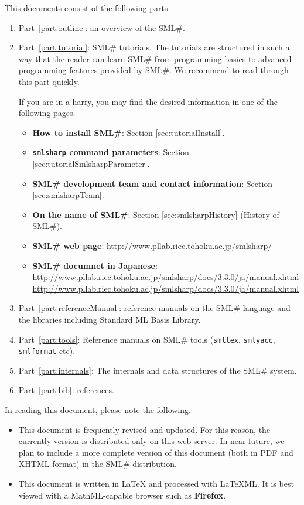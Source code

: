 \documentclass{jbook}
\newcommand{\smlsharp}{SML\#}
\newcommand{\version}{3.3.0}
\newcommand{\documentUrlJa}{\url{http://www.pllab.riec.tohoku.ac.jp/smlsharp/docs/3.3.0/ja/manual.xhtml}}
\begin{document}
\else%
	This documents consist of the following parts.
\begin{enumerate}
\item
	Part~\ref{part:outline}:
an overview of the \smlsharp{}.
\item
	Part~\ref{part:tutorial}: \smlsharp{} tutorials.
	The tutorials are structured in such a way that the reader can
learn \smlsharp{} from programming basics to advanced programming
features provided by \smlsharp{}.
	We recommend to read through this part quickly.

	If you are in a harry, you may find the desired information in
one of the following pages.
\begin{itemize}
\item {\bf How to install \smlsharp{}}:
Section \ref{sec:tutorialInstall}.
\item {\bf {\tt smlsharp} command parameters}:
Section \ref{sec:tutorialSmlsharpParameter}.
\item {\bf \smlsharp{} development team and contact information}:
Section \ref{sec:smlsharpTeam}.
\item {\bf On the name of \smlsharp{}}:
Section \ref{sec:smlsharpHistory} (History of \smlsharp).
\item {\bf \smlsharp{} web page}: 
\url{http://www.pllab.riec.tohoku.ac.jp/smlsharp/}
\item {\bf \smlsharp{} documnet in Japanese}:
\url{http://www.pllab.riec.tohoku.ac.jp/smlsharp/docs/\version/ja/manual.xhtml}
\documentUrlJa
\end{itemize}

\item
	Part~\ref{part:referenceManual}:
reference manuals on the \smlsharp{} language and the libraries
including Standard ML Basis Library.

\item
	Part~\ref{part:tools}:
Reference manuals on \smlsharp{} tools 
({\tt smllex}, {\tt smlyacc}, {\tt smlformat} etc).

\item
	Part~\ref{part:internals}:
	The internals and data structures of the \smlsharp{} system.

\item
	Part~\ref{part:bib}: references.
\end{enumerate}

In reading this document, please note the following.
\begin{itemize}
\item 
	This document is frequently revised and updated.
	For this reason, the currently version is distributed only on
this web server.
	In near future, we plan to include a more complete version of
this document (both in PDF and XHTML format) in the \smlsharp{}
distribution.

\item 
	This document is written in LaTeX and processed with LaTeXML.
	It is best viewed with a MathML-capable browser such as {\bf
Firefox}.
\end{itemize}
\fi%
\end{document}

